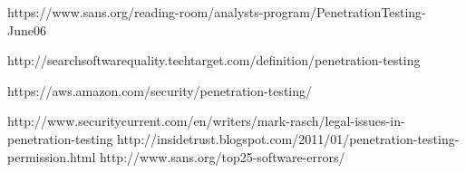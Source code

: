 \documentclass{article}
\begin{document}
\begin{thebibliography}{1}
     https://www.sans.org/reading-room/analysts-program/PenetrationTesting-June06

        http://searchsoftwarequality.techtarget.com/definition/penetration-testing

     https://aws.amazon.com/security/penetration-testing/

        http://www.securitycurrent.com/en/writers/mark-rasch/legal-issues-in-penetration-testing
     http://insidetrust.blogspot.com/2011/01/penetration-testing-permission.html
        http://www.sans.org/top25-software-errors/
\end{thebibliography}
\end{document}
